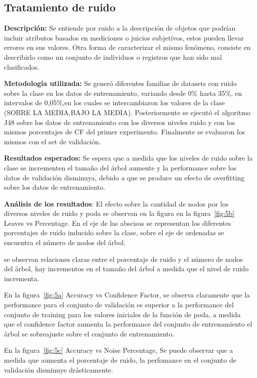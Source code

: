 \subsection{Tratamiento de ruido}

\textbf{Descripción:} Se entiende por ruido a la descripción de objetos que podrían incluir
atributos basados en mediciones o juicios subjetivos, estos pueden llevar 
errores en sus valores. Otra forma de caracterizar el mismo fenómeno, consiste en
describirlo como un conjunto de individuos o registros que han sido mal clasificados.

\textbf{Metodología utilizada:} Se generó diferentes familias de datasets con ruido sobre la clase en los datos
de entrenamiento, variando desde 0\% hasta 35\%, en intervalos de 0,05\%,en los cuales
se intercambiaron los valores de la clase (SOBRE LA MEDIA,BAJO LA MEDIA).
Posteriormente se ejecutó el algoritmo J48 sobre los datos de entrenamiento con los
diversos niveles ruido y con los mismos porcentajes de CF del primer experimento.
Finalmente se evaluaron los mismos con el set de validación.

\textbf{Resultados esperados:} Se espera que a medida que los niveles de ruido sobre la clase
se incrementen el tamaño del árbol aumente y la performance sobre los datos de
validación disminuya, debido a que se produce un efecto de overfitting sobre los datos de
entrenamiento.

\textbf{Análisis de los resultados}:
El efecto sobre la cantidad de nodos por los diversos niveles
de ruido y poda se observan en la figura en la figura~\ref{fig:5b} Leaves vs Percentage.
En el eje de las abscisas se representan los diferentes porcentajes de ruido inducido sobre la clase, sobre
el eje de ordenadas se encuentra el número de nodos del árbol.

se observan relaciones claras entre el porcentaje de ruido y
el número de nodos del árbol,  hay incrementos 
en el tamaño del árbol a medida que el nivel de ruido incrementa.

En la figura~\ref{fig:5a} Accuracy vs Confidence Factor,
se observa claramente que la performance para el 
conjunto de validación es superior a la performance del conjunto de training 
para los valores iniciales de la función de poda, a medida que el confidence factor
aumenta la performance del conjunto de entrenamiento el árbol se sobreajuste sobre
el conjunto de entrenamiento.

En la figura~\ref{fig:5c} Accuracy vs Noise Percentage,
Se puede observar que a medida que aumenta el porcentaje de 
ruido, la perfomance en el conjunto de validación disminuye drásticamente.




